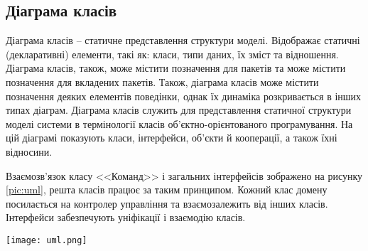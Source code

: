 \subsection{Діаграма класів}
\par Діаграма класів -- статичне представлення структури моделі. Відображає статичні (декларативні) елементи, такі як: класи, типи даних, їх зміст та відношення. Діаграма класів, також, може містити позначення для пакетів та може містити позначення для вкладених пакетів. Також, діаграма класів може містити позначення деяких елементів поведінки, однак їх динаміка розкривається в інших типах діаграм. Діаграма класів служить для представлення статичної структури моделі системи в термінології класів об'єктно-орієнтованого програмування. На цій діаграмі показують класи, інтерфейси, об'єкти й кооперації, а також їхні відносини.
\par Взаємозв'язок класу <<Команд>> і загальних інтерфейсів зображено на рисунку \ref{pic:uml}, решта класів працює за таким принципом. Кожний клас домену посилається на контролер управління та взаємозалежить від інших класів. 
Інтерфейси забезпечують уніфікації і взаємодію класів.
\begin{center}
		\centering
				\texttt{[image: uml.png]}
				\vspace{18pt}
				\label{pic:uml}
		\end{center}



